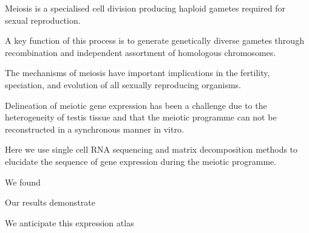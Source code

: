 Meiosis is a specialised cell division producing haploid gametes required for sexual reproduction.

A key function of this process is to generate genetically diverse gametes through recombination and independent assortment of homologous chromosomes.

The mechanisms of meiosis have important implications in the fertility, speciation, and evolution of all sexually reproducing organisms.




Delineation of meiotic gene expression has been a challenge due to the heterogeneity of testis tissue  and that the meiotic programme can not be reconstructed in a synchronous manner in vitro.

Here we use single cell RNA sequencing and matrix decomposition methods to elucidate the sequence of gene expression during the meiotic programme.


We found 


Our results demonstrate


We anticipate this expression atlas